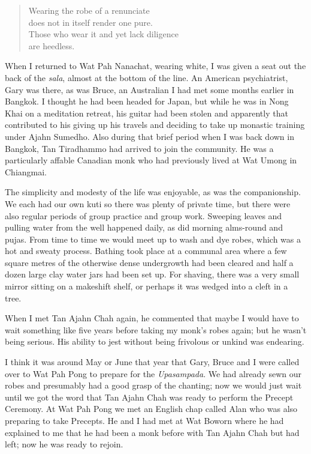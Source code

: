 \begin{quote}
  Wearing the robe of a renunciate\\
  does not in itself render one pure.\\
  Those who wear it and yet lack diligence\\
  are heedless.
\end{quote}

When I returned to Wat Pah Nanachat, wearing white, I was given a seat
out the back of the \emph{sala}, almost at the bottom of the line. An
American psychiatrist, Gary was there, as was Bruce, an Australian I had
met some months earlier in Bangkok. I thought he had been headed for
Japan, but while he was in Nong Khai on a meditation retreat, his guitar
had been stolen and apparently that contributed to his giving up his
travels and deciding to take up monastic training under Ajahn Sumedho.
Also during that brief period when I was back down in Bangkok, Tan
Tiradhammo had arrived to join the community. He was a particularly
affable Canadian monk who had previously lived at Wat Umong in
Chiangmai.

The simplicity and modesty of the life was enjoyable, as was the
companionship. We each had our own kuti so there was plenty of private
time, but there were also regular periods of group practice and group
work. Sweeping leaves and pulling water from the well happened daily, as
did morning \mbox{alms-round} and pujas. From time to time we would meet up to
wash and dye robes, which was a hot and sweaty process. Bathing took
place at a communal area where a few square metres of the otherwise
dense undergrowth had been cleared and half a dozen large clay water
jars had been set up. For shaving, there was a very small mirror sitting
on a makeshift shelf, or perhaps it was wedged into a cleft in a tree.

When I met Tan Ajahn Chah again, he commented that maybe I would have to
wait something like five years before taking my monk's robes again; but
he wasn't being serious. His ability to jest without being frivolous or
unkind was endearing.

I think it was around May or June that year that Gary, Bruce and I were
called over to Wat Pah Pong to prepare for the \emph{Upasampada}. We had
already sewn our robes and presumably had a good grasp of the chanting;
now we would just wait until we got the word that Tan Ajahn Chah was
ready to perform the Precept Ceremony. At Wat Pah Pong we met an English
chap called Alan who was also preparing to take Precepts. He and I had
met at Wat Boworn where he had explained to me that he had been a monk
before with Tan Ajahn Chah but had left; now he was ready to rejoin.


